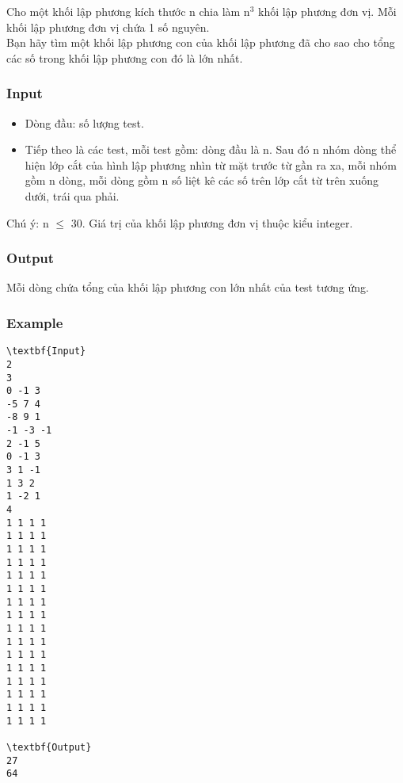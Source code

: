 

Cho một khối lập phương kích thước n chia làm n$^3 $ khối lập phương đơn vị. Mỗi khối lập phương đơn vị chứa 1 số nguyên.
\\Bạn hãy tìm một khối lập phương con của khối lập phương đã cho sao cho tổng các số trong khối lập phương con đó là lớn nhất.

\subsubsection{Input}
\begin{itemize}
	\item Dòng đầu: số lượng test.
	\item Tiếp theo là các test, mỗi test gồm: dòng đầu là n. Sau đó n nhóm dòng thể hiện lớp cắt của hình lập phương nhìn từ mặt trước từ gần ra xa, mỗi nhóm gồm n dòng, mỗi dòng gồm n số liệt kê các số trên lớp cắt từ trên xuống dưới, trái qua phải.
\end{itemize}

Chú ý: n  $\le$  30. Giá trị của khối lập phương đơn vị thuộc kiểu integer.

\subsubsection{Output}

Mỗi dòng chứa tổng của khối lập phương con lớn nhất của test tương ứng.

\subsubsection{Example}
\begin{verbatim}
\textbf{Input}
2
3
0 -1 3
-5 7 4
-8 9 1
-1 -3 -1
2 -1 5
0 -1 3
3 1 -1
1 3 2
1 -2 1
4
1 1 1 1
1 1 1 1
1 1 1 1
1 1 1 1
1 1 1 1
1 1 1 1
1 1 1 1
1 1 1 1
1 1 1 1
1 1 1 1
1 1 1 1
1 1 1 1
1 1 1 1
1 1 1 1
1 1 1 1
1 1 1 1

\textbf{Output}
27
64
\end{verbatim}
